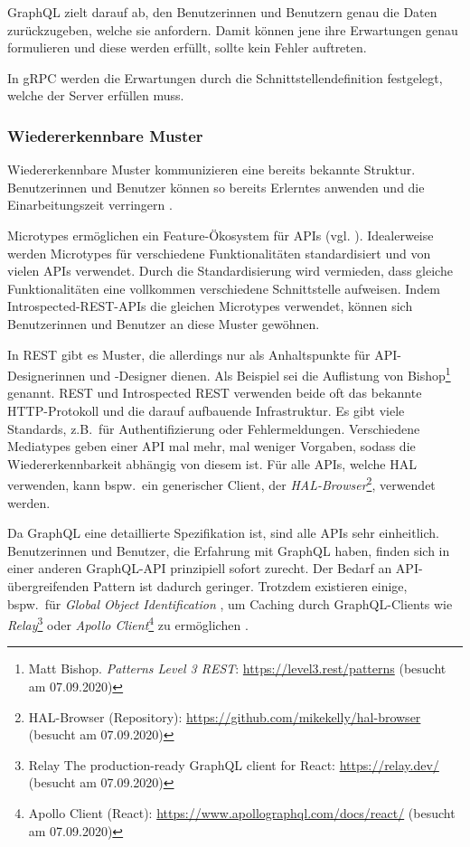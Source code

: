 GraphQL zielt darauf ab, den Benutzerinnen und Benutzern genau die Daten zurückzugeben, welche sie anfordern. Damit können jene ihre Erwartungen genau formulieren und diese werden erfüllt, sollte kein Fehler auftreten.

In gRPC werden die Erwartungen durch die Schnittstellendefinition festgelegt, welche der Server erfüllen muss.


\subsubsection{Wiedererkennbare Muster}
Wiedererkennbare Muster kommunizieren eine bereits bekannte Struktur. Benutzerinnen und Benutzer können so bereits Erlerntes anwenden und die Einarbeitungszeit verringern \autocite[S.~14f.]{Tidwell2011}.

\para{}Microtypes ermöglichen ein Feature-Ökosystem für APIs (vgl. ). Idealerweise werden Microtypes für verschiedene Funktionalitäten standardisiert und von vielen APIs verwendet. Durch die Standardisierung wird vermieden, dass gleiche Funktionalitäten eine vollkommen verschiedene Schnittstelle aufweisen. Indem Introspected-REST-APIs die gleichen Microtypes verwendet, können sich Benutzerinnen und Benutzer an diese Muster gewöhnen.

In REST gibt es Muster, die allerdings nur als Anhaltspunkte für API-Designerinnen und -Designer dienen. Als Beispiel sei die Auflistung von Bishop\footnote{Matt Bishop. \textit{Patterns \textendash{} Level 3 REST}: \url{https://level3.rest/patterns} (besucht am 07.09.2020)} genannt. REST und Introspected REST verwenden beide oft das bekannte HTTP-Protokoll und die darauf aufbauende Infrastruktur. Es gibt viele Standards, z.B.\ für Authentifizierung oder Fehlermeldungen. Verschiedene Mediatypes geben einer API mal mehr, mal weniger Vorgaben, sodass die Wiedererkennbarkeit abhängig von diesem ist. Für alle APIs, welche HAL verwenden, kann bspw.\ ein generischer Client, der \textit{HAL-Browser}\footnote{HAL-Browser (Repository): \url{https://github.com/mikekelly/hal-browser} (besucht am 07.09.2020)}, verwendet werden.

Da GraphQL eine detaillierte Spezifikation ist, sind alle APIs sehr einheitlich. Benutzerinnen und Benutzer, die Erfahrung mit GraphQL haben, finden sich in einer anderen GraphQL-API prinzipiell sofort zurecht. Der Bedarf an API-übergreifenden Pattern ist dadurch geringer. Trotzdem existieren einige, bspw.\ für \emph{Global Object Identification} \autocite{LearnGraphQL_Identification}, um Caching durch GraphQL-Clients wie \textit{Relay}\footnote{Relay \textendash{} The production-ready GraphQL client for React: \url{https://relay.dev/} (besucht am 07.09.2020)} oder \textit{Apollo Client}\footnote{Apollo Client (React): \url{https://www.apollographql.com/docs/react/} (besucht am 07.09.2020)} zu ermöglichen \autocite{LearnGraphQL_Identification}.

